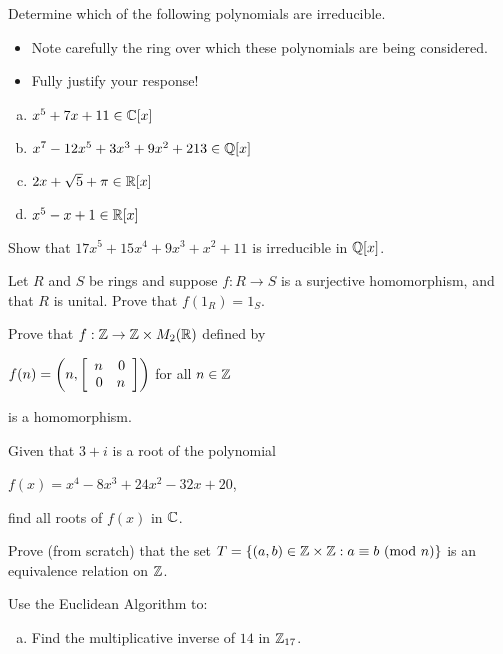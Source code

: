 \documentclass[11pt]{exam}
\begin{document}
\begin{questions}
\question[6] Determine which of the following polynomials are irreducible.
\begin{itemize}
\item Note carefully the ring over which these polynomials are being considered.
\item Fully justify your response!
\end{itemize}
\begin{enumerate}[(a)]
\item $x^5 + 7x + 11\in \C[x]$
\vfill

\item $x^7 - 12x^5 + 3x^3 + 9x^2 + 213\in\Q[x]$
\vfill

\item $2x + \sqrt{5} + \pi \in \R[x]$
\vfill

\item $x^5 - x + 1\in \R[x]$
\vfill
\end{enumerate}
\newpage

\question[3] Show that $17x^5 + 15x^4 + 9x^3 + x^2 + 11$ is irreducible in $\Q[x]$.
\newpage

\question[3] Let $R$ and $S$ be rings and suppose $f:R\to S$ is a surjective homomorphism, and that $R$ is unital.  Prove that $f(1_{R}) = 1_{S}$.
\vspace{5cm}


\question[3] Prove that $f:\Z\to \Z\times M_{2}(\R)$ defined by
\begin{center}
$f(n) = \left(n,\MATRIX{rr}{n & 0\\0 & n}\right)$ for all $n\in \Z$
\end{center}
is a homomorphism.
\vfill

\newpage

\question[5] Given that $3 + i$ is a root of the polynomial
\begin{center}
$f(x) = x^4 - 8x^3 + 24x^2 - 32x + 20$,
\end{center}
find all roots of $f(x)$ in $\C$.
\newpage

\question[5] Prove (from scratch) that the set $T = \SET{(a,b)\in \Z\times \Z:a\equiv b\text{ (mod }n\text{)}}$ is an equivalence relation on $\Z$.
\newpage

\question[5] Use the Euclidean Algorithm to:
\begin{enumerate}[(a)]
\item Find the multiplicative inverse of $14$ in $\Z_{17}$.
\vfill


\end{enumerate}
\end{questions}
\end{document}
